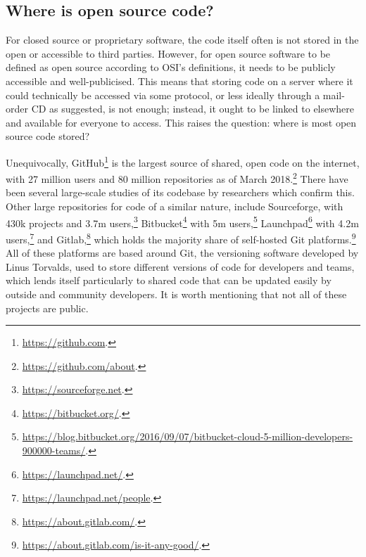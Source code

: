 
\subsection{Where is open source code?}
\label{subsec:where-is-open-source-code}

For closed source or proprietary software, the code itself often is not stored in the open or accessible to third parties. However, for open source software to be defined as open source according to OSI's definitions, it needs to be publicly accessible and well-publicised. This means that storing code on a server where it could technically be accessed via some protocol, or less ideally through a mail-order CD as \citet{krauwer2006strengthening} suggested, is not enough; instead, it ought to be linked to elsewhere and available for everyone to access. This raises the question: where is most open source code stored?

Unequivocally, GitHub\footnote{\href{https://github.com}{https://github.com}. } is the largest source of shared, open code on the internet, with 27 million users and 80 million repositories as of March 2018.\footnote{\href{https://github.com/about}{https://github.com/about}. } There have been several large-scale studies of its codebase by researchers \citep{gousios2012ghtorrent, allamanis2013mining, gousios2014lean, kalliamvakou2014promises, beller2016analyzing} which confirm this. Other large repositories for code of a similar nature, include Sourceforge, with 430k projects and 3.7m users,\footnote{\href{https://sourceforge.net/}{https://sourceforge.net}. } Bitbucket\footnote{\href{https://bitbucket.org/}{https://bitbucket.org/}. } with 5m users,\footnote{\href{https://blog.bitbucket.org/2016/09/07/bitbucket-cloud-5-million-developers-900000-teams/}{https://blog.bitbucket.org/2016/09/07/bitbucket-cloud-5-million-developers-900000-teams/}. } Launchpad\footnote{\href{https://launchpad.net/}{https://launchpad.net/}. } with 4.2m users,\footnote{\href{https://launchpad.net/people}{https://launchpad.net/people}. } and Gitlab,\footnote{\href{https://about.gitlab.com/}{https://about.gitlab.com/}. } which holds the majority share of self-hosted Git platforms.\footnote{\href{https://about.gitlab.com/is-it-any-good/}{https://about.gitlab.com/is-it-any-good/}. } All of these platforms are based around Git, the versioning software developed by Linus Torvalds, used to store different versions of code for developers and teams, which lends itself particularly to shared code that can be updated easily by outside and community developers. It is worth mentioning that not all of these projects are public.

